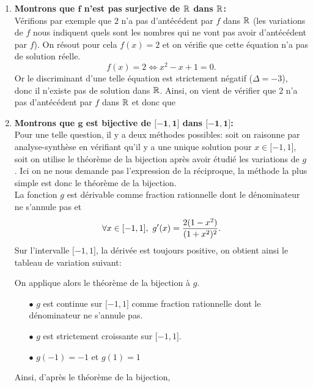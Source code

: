 \documentclass[a4paper, 11pt,reqno]{article}
\begin{document}
\begin{correction}
\begin{enumerate}
		\item \textbf{Montrons que $\mathbf{f}$ n'est pas surjective de $\mathbf{\mathbb{R}}$ dans $\mathbf{\mathbb{R}}$:}\\
		      V\'erifions par exemple que $2$ n'a pas d'ant\'ec\'edent par $f$ dans $\mathbb{R}$ (les variations de $f$ nous indiquent quels sont les nombres qui ne vont pas avoir d'ant\'ec\'edent par $f$). On r\'esout pour cela $f(x)=2$ et on v\'erifie que cette \'equation n'a pas de solution r\'eelle.
		      $$
			      f(x)=2\Leftrightarrow  x^2-x+1=0.
		      $$
		      Or le discriminant d'une telle \'equation est strictement n\'egatif ($\Delta=-3$), donc il n'existe pas de solution dans $\mathbb{R}$. Ainsi, on vient de v\'erifier que $2$ n'a pas d'ant\'ec\'edent par $f$ dans $\mathbb{R}$ et donc que 
		\item \textbf{Montrons que $\mathbf{g}$ est bijective de $\mathbf{\lbrack -1,1\rbrack}$ dans $\mathbf{\lbrack -1,1\rbrack}$:}\\
		      Pour une telle question, il y a deux m\'ethodes possibles: soit on raisonne par analyse-synth\`ese en v\'erifiant qu'il y a une unique solution pour $x\in\lbrack -1,1\rbrack$, soit on utilise le th\'eor\`eme de la bijection apr\`es avoir \'etudi\'e les variations de $g$. Ici on ne nous demande pas l'expression de la r\'eciproque, la m\'ethode la plus simple est donc le
		      th\'eor\`{e}me de la bijection. \\
		      \noindent La fonction $g$ est d\'erivable comme fraction rationnelle dont le d\'enominateur ne s'annule pas et
		      $$\forall x\in\lbrack -1,1\rbrack,\ g^{\prime}(x)=\displaystyle\frac{2(1-x^2)}{(1+x^2)^2}.$$
		      Sur l'intervalle $\lbrack -1,1\rbrack$, la d\'eriv\'ee est toujours positive, on obtient ainsi le tableau de variation suivant:
		      \begin{center}
		      \end{center}
		      On applique alors le th\'eor\`eme de la bijection \`a $g$.
		      \begin{itemize}
			      \item[$\bullet$] $g$ est continue sur $\lbrack -1,1\rbrack$ comme fraction rationnelle dont le d\'enominateur ne s'annule pas.
			      \item[$\bullet$] $g$ est strictement croissante sur $\lbrack -1,1\rbrack$.
			      \item[$\bullet$] $g(-1)=-1$ et $g(1)=1$
		      \end{itemize}
		      Ainsi, d'apr\`es le th\'eor\`eme de la bijection, 
	\end{enumerate}
\end{correction}
\end{document}
